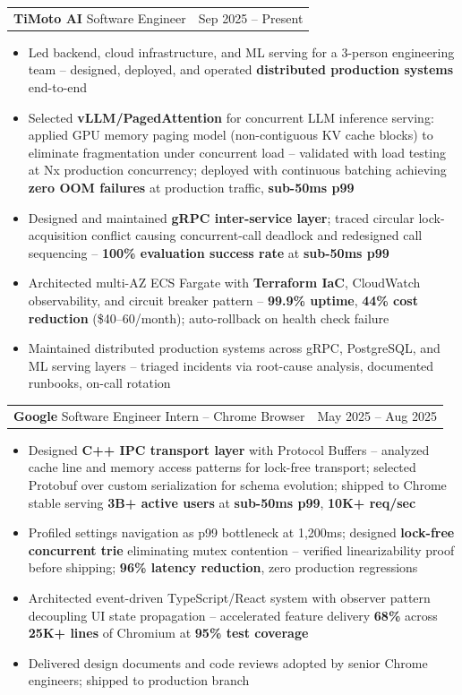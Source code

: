 \documentclass[letterpaper,11pt]{article}
\makeatletter
\newcommand{\resumeItem}[1]{
  \item\small{{#1 \vspace{-2pt}}}
}
\newcommand{\resumeSubheadingShortSplit}[3]{%
  \vspace{-2pt}\item
    \begin{tabular*}{0.98\textwidth}[t]{l@{\extracolsep{\fill}}r}
      {\normalsize\textbf{#1}} \textbar{} {\normalsize #2} & {\normalsize #3} \\
    \end{tabular*}\vspace{-7pt}
}
\newcommand{\resumeItemListStart}{\begin{itemize}}
\newcommand{\resumeItemListEnd}{\end{itemize}\vspace{-5pt}}
\makeatother
\begin{document}
    \resumeSubheadingShortSplit
      {TiMoto AI}{Software Engineer}{Sep 2025 -- Present}
        \resumeItemListStart
          \resumeItem{Led backend, cloud infrastructure, and ML serving for a 3-person engineering team -- designed, deployed, and operated \textbf{distributed production systems} end-to-end}
          \resumeItem{Selected \textbf{vLLM/PagedAttention} for concurrent LLM inference serving: applied GPU memory paging model (non-contiguous KV cache blocks) to eliminate fragmentation under concurrent load -- validated with load testing at Nx production concurrency; deployed with continuous batching achieving \textbf{zero OOM failures} at production traffic, \textbf{sub-50ms p99}}
          \resumeItem{Designed and maintained \textbf{gRPC inter-service layer}; traced circular lock-acquisition conflict causing concurrent-call deadlock and redesigned call sequencing -- \textbf{100\% evaluation success rate} at \textbf{sub-50ms p99}}
          \resumeItem{Architected multi-AZ ECS Fargate with \textbf{Terraform IaC}, CloudWatch observability, and circuit breaker pattern -- \textbf{99.9\% uptime}, \textbf{44\% cost reduction} (\$40--60/month); auto-rollback on health check failure}
          \resumeItem{Maintained distributed production systems across gRPC, PostgreSQL, and ML serving layers -- triaged incidents via root-cause analysis, documented runbooks, on-call rotation}
      \resumeItemListEnd

    \resumeSubheadingShortSplit
      {Google}{Software Engineer Intern -- Chrome Browser}{May 2025 -- Aug 2025}
      \resumeItemListStart
        \resumeItem{Designed \textbf{C++ IPC transport layer} with Protocol Buffers -- analyzed cache line and memory access patterns for lock-free transport; selected Protobuf over custom serialization for schema evolution; shipped to Chrome stable serving \textbf{3B+ active users} at \textbf{sub-50ms p99}, \textbf{10K+ req/sec}}
        \resumeItem{Profiled settings navigation as p99 bottleneck at 1,200ms; designed \textbf{lock-free concurrent trie} eliminating mutex contention -- verified linearizability proof before shipping; \textbf{96\% latency reduction}, zero production regressions}
        \resumeItem{Architected event-driven TypeScript/React system with observer pattern decoupling UI state propagation -- accelerated feature delivery \textbf{68\%} across \textbf{25K+ lines} of Chromium at \textbf{95\% test coverage}}
        \resumeItem{Delivered design documents and code reviews adopted by senior Chrome engineers; shipped to production branch}
      \resumeItemListEnd
\end{document}
